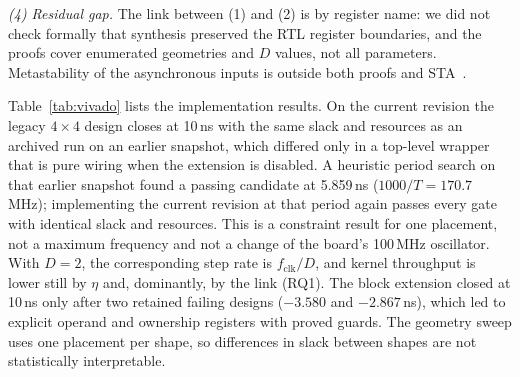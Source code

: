 \emph{(4) Residual gap.} The link between (1) and (2) is by register name:
we did not check formally that synthesis preserved the RTL register
boundaries, and the proofs cover enumerated geometries and $D$ values, not
all parameters. Metastability of the asynchronous inputs is outside both
proofs and STA~\cite{ginosar-metastability}.

Table~\ref{tab:vivado} lists the implementation results. On the current
revision the legacy $4\times4$ design closes at 10\,ns with the same slack
and resources as an archived run on an earlier snapshot, which differed only
in a top-level wrapper that is pure wiring when the extension is disabled.
A heuristic period search on that earlier snapshot found a passing
candidate at 5.859\,ns ($1000/T=170.7$\,MHz); implementing the current
revision at that period again passes every gate with identical slack and
resources. This is a constraint result for one placement, not a maximum
frequency and not a change of the board's 100\,MHz oscillator. With $D=2$, the corresponding step rate is
$f_{\mathrm{clk}}/D$, and kernel throughput is lower still by $\eta$ and,
dominantly, by the link (RQ1). The block extension closed at 10\,ns only
after two retained failing designs ($-3.580$ and $-2.867$\,ns), which led
to explicit operand and ownership registers with proved guards. The
geometry sweep uses one placement per shape, so differences in slack
between shapes are not statistically interpretable.




